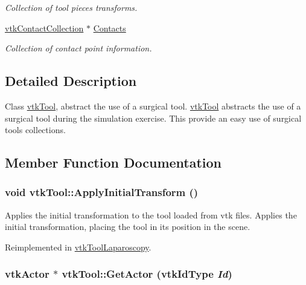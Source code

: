 \begin{DoxyCompactItemize}
\begin{DoxyCompactList}\small\item\em Collection of tool pieces transforms. \item\end{DoxyCompactList}\item 
\hypertarget{classvtkTool_a4c5762114b1d850f0f471d260c45ebaf}{
\hyperlink{classvtkContactCollection}{vtkContactCollection} $\ast$ \hyperlink{classvtkTool_a4c5762114b1d850f0f471d260c45ebaf}{Contacts}}
\label{classvtkTool_a4c5762114b1d850f0f471d260c45ebaf}

\begin{DoxyCompactList}\small\item\em Collection of contact point information. \item\end{DoxyCompactList}\end{DoxyCompactItemize}


\subsection{Detailed Description}
Class \hyperlink{classvtkTool}{vtkTool}, abstract the use of a surgical tool. \hyperlink{classvtkTool}{vtkTool} abstracts the use of a surgical tool during the simulation exercise. This provide an easy use of surgical tools collections. 

\subsection{Member Function Documentation}
\hypertarget{classvtkTool_af5802e4ba0d2c217bef741ce55ee2b0e}{
\subsubsection[{ApplyInitialTransform}]{\setlength{\rightskip}{0pt plus 5cm}void vtkTool::ApplyInitialTransform ()}}
\label{classvtkTool_af5802e4ba0d2c217bef741ce55ee2b0e}


Applies the initial transformation to the tool loaded from vtk files. Applies the initial transformation, placing the tool in its position in the scene. 

Reimplemented in \hyperlink{classvtkToolLaparoscopy_a55c7ce0e9156ae3547dbe32a4fef1057}{vtkToolLaparoscopy}.\hypertarget{classvtkTool_a2e87421054997a9c6e69302516064dab}{
\subsubsection[{GetActor}]{\setlength{\rightskip}{0pt plus 5cm}vtkActor $\ast$ vtkTool::GetActor (vtkIdType {\em Id})}}
\label{classvtkTool_a2e87421054997a9c6e69302516064dab}


